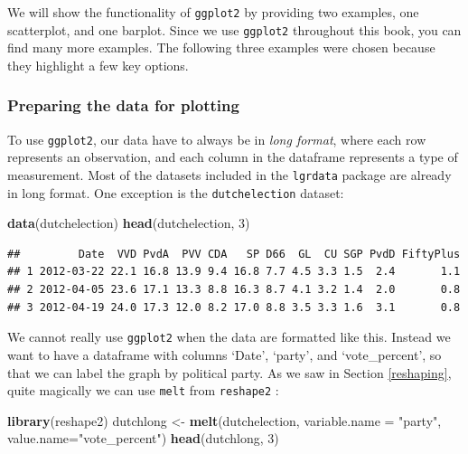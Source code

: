 \documentclass[]{book}
\newenvironment{Shaded}{\begin{snugshade}}{\end{snugshade}}
\newcommand{\DataTypeTok}[1]{\textcolor[rgb]{0.13,0.29,0.53}{#1}}
\newcommand{\DecValTok}[1]{\textcolor[rgb]{0.00,0.00,0.81}{#1}}
\newcommand{\KeywordTok}[1]{\textcolor[rgb]{0.13,0.29,0.53}{\textbf{#1}}}
\newcommand{\NormalTok}[1]{#1}
\newcommand{\StringTok}[1]{\textcolor[rgb]{0.31,0.60,0.02}{#1}}
\begin{document}
We will show the functionality of \texttt{ggplot2} by providing two examples, one scatterplot, and one barplot. Since we use \texttt{ggplot2} throughout this book, you can find many more examples. The following three examples were chosen because they highlight a few key options.

\hypertarget{preparing-the-data-for-plotting}{%
\subsubsection{Preparing the data for plotting}\label{preparing-the-data-for-plotting}}

To use \texttt{ggplot2}, our data have to always be in \emph{long format}, where each row represents an observation, and each column in the dataframe represents a type of measurement. Most of the datasets included in the \texttt{lgrdata} package are already in long format. One exception is the \texttt{dutchelection} dataset:

\begin{Shaded}
\begin{Highlighting}[]
\KeywordTok{data}\NormalTok{(dutchelection)}
\KeywordTok{head}\NormalTok{(dutchelection, }\DecValTok{3}\NormalTok{)}
\end{Highlighting}
\end{Shaded}

\begin{verbatim}
##         Date  VVD PvdA  PVV CDA   SP D66  GL  CU SGP PvdD FiftyPlus
## 1 2012-03-22 22.1 16.8 13.9 9.4 16.8 7.7 4.5 3.3 1.5  2.4       1.1
## 2 2012-04-05 23.6 17.1 13.3 8.8 16.3 8.7 4.1 3.2 1.4  2.0       0.8
## 3 2012-04-19 24.0 17.3 12.0 8.2 17.0 8.8 3.5 3.3 1.6  3.1       0.8
\end{verbatim}

We cannot really use \texttt{ggplot2} when the data are formatted like this. Instead we want to have a dataframe with columns `Date', `party', and `vote\_percent', so that we can label the graph by political party. As we saw in Section \ref{reshaping}, quite magically we can use \texttt{melt} from \texttt{reshape2} :

\begin{Shaded}
\begin{Highlighting}[]
\KeywordTok{library}\NormalTok{(reshape2)}
\NormalTok{dutchlong <-}\StringTok{ }\KeywordTok{melt}\NormalTok{(dutchelection, }\DataTypeTok{variable.name =} \StringTok{"party"}\NormalTok{, }\DataTypeTok{value.name=}\StringTok{"vote_percent"}\NormalTok{)}
\KeywordTok{head}\NormalTok{(dutchlong, }\DecValTok{3}\NormalTok{)}
\end{Highlighting}
\end{Shaded}
\end{document}
